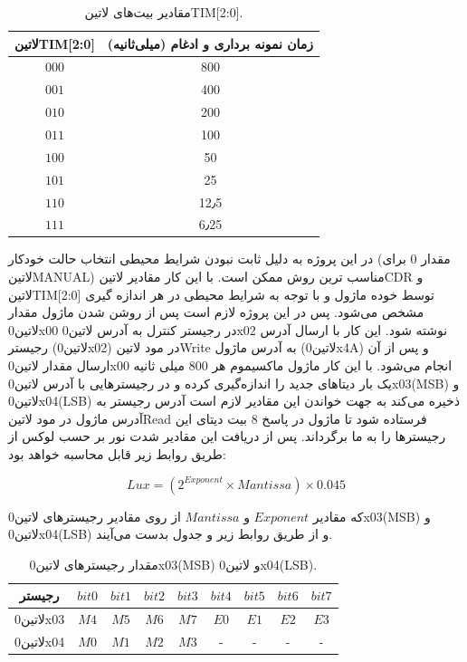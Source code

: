 \begin{table}[!h]
	\centering
	\caption{مقادیر بیت‌های ‌لاتین{TIM[2:0]}.}
	\label{table:BMP180persure}
	\begin{tabular}{c|c}
		‌لاتین{TIM[2:0]} & زمان نمونه برداری و ادغام (میلی‌ثانیه)\\
		\hline
		$000$ & 800 \\
		$001$ & 400 \\
		$010$ & 200 \\
		$011$ & 100 \\
		$100$ & 50 \\
		$101$ & 25 \\
		$110$ & 12٫5 \\
		$111$ & 6٫25 \\
	\end{tabular}
\end{table}
\noindent
در این پروژه به دلیل ثابت نبودن شرایط محیطی انتخاب حالت خودکار (مقدار $0$ برای ‌لاتین{MANUAL}) مناسب ترین روش ممکن است. با این کار مقادیر ‌لاتین{CDR} و ‌لاتین{TIM[2:0]} توسط خوده ماژول و با توجه به شرایط محیطی در هر اندازه گیری مشخص می‌شود. پس در این پروژه لازم است پس از روشن شدن ماژول مقدار ‌لاتین{0x00} در رجیستر کنترل به آدرس ‌لاتین{0x02} نوشته شود. این کار با ارسال آدرس رجیستر (‌لاتین{0x02}) در مود ‌لاتین{Write} به آدرس ماژول (‌لاتین{0x4A}) و پس از آن ارسال مقدار ‌لاتین{0x00} انجام می‌شود. با این کار ماژول ماکسیموم هر 800 میلی ثانیه یک بار دیتا‌های جدید را اندازه‌گیری کرده و در رجیستر‌هایی با آدرس ‌لاتین{0x03(MSB)} و ‌لاتین{0x04(LSB)} ذخیره می‌کند به جهت خواندن این مقادیر لازم است آدرس رجیستر به آدرس ماژول در مود ‌لاتین{Read} فرستاده شود تا ماژول در پاسخ 8 بیت دیتای این رجیستر‌ها را به ما برگرداند. پس از دریافت این مقادیر شدت نور بر حسب لوکس از طریق روابط زیر قابل محاسبه خواهد بود:
\begin{fleqn}
	\begin{equation*}
		Lux = (2^{Exponent} \times Mantissa) \times 0.045
	\end{equation*}
\end{fleqn}
\noindent
که مقادیر $Exponent$ و $Mantissa$ از روی مقادیر رجیستر‌های ‌لاتین{0x03(MSB)} و ‌لاتین{0x04(LSB)} و از طریق روابط زیر و جدول  بدست می‌آیند.

\begin{table}[!h]
	\centering
	\caption{مقدار رجیستر‌های ‌لاتین{0x03(MSB)} و ‌لاتین{0x04(LSB)}.}
	\label{table:MAX44009DataRegisters}
	\begin{tabular}{c|cccccccc}
		رجیستر & $bit 0$ & $bit 1$ & $bit 2$ & $bit 3$ & $bit 4$ & $bit 5$ & $bit 6$ & $bit 7$\\
		\hline
		‌لاتین{0x03} & $M4$ & $M5$ & $M6$ & $M7$ & $E0$ & $E1$ & $E2$ & $E3$ \\
		‌لاتین{0x04} & $M0$ & $M1$ & $M2$ & $M3$ & - & - & - & - \\
	\end{tabular}
\end{table}


